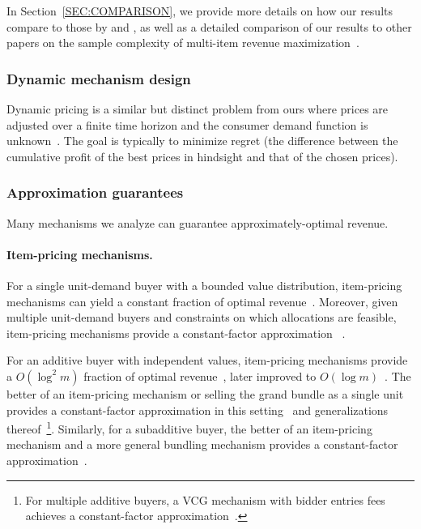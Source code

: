 In Section~\ref{SEC:COMPARISON}, we provide more details on how our results compare to those by \citet{Morgenstern16:Learning} and \citet{Syrgkanis17:Sample}, as well as a detailed comparison of our results to other papers on the sample complexity of multi-item revenue maximization~\citep{Balcan16:Sample, Medina17:Revenue, Cai17:Learning,Gonczarowski18:Sample}.

\subsubsection{Dynamic mechanism design} Dynamic pricing is a  similar but distinct problem from ours where prices are adjusted over a finite time horizon and the consumer demand function is unknown~\citep[e.g.,][all of whom study single-item settings]{Araman09:Dynamic,Besbes09:Dynamic,Broder12:Dynamic}. The goal is typically to minimize regret (the difference between the cumulative profit of the best prices in hindsight and that of the chosen prices).


\subsubsection{Approximation guarantees}\label{sec:apx}
Many mechanisms we analyze can guarantee approximately-optimal revenue.

\paragraph{Item-pricing mechanisms.} For a single unit-demand buyer with a bounded value distribution, item-pricing mechanisms can yield a constant fraction of optimal revenue~\citep{Chawla07:Algorithmic}. Moreover, given multiple unit-demand buyers and constraints on which allocations are feasible, item-pricing mechanisms provide a constant-factor approximation~ \citep{Chawla10:Multi}.

For an additive buyer with independent values, item-pricing mechanisms provide a $O(\log^2 m)$ fraction of optimal revenue~\citep{Hart12:Approximate}, later improved to $O(\log m)$~\citep{Li13:Revenue}.
The better of an item-pricing mechanism or selling the grand bundle as a single unit provides a constant-factor approximation in this setting~\citep{Babaioff14:Simple} and generalizations thereof~\citep{Bateni15:Revenue,Eden21:Simple}\footnote{For multiple additive buyers, a VCG mechanism with bidder entries fees achieves a constant-factor approximation~\citep{Yao14:n}.}. Similarly, for a subadditive buyer, the better of an item-pricing mechanism and a more general bundling mechanism provides a constant-factor approximation~\citep{Rubinstein15:Simple}.

